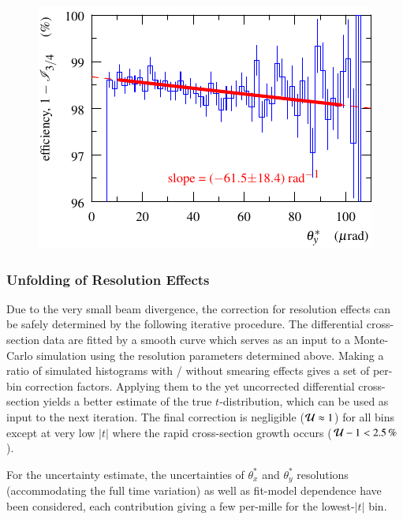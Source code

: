 \begin{figure}
\begin{center}
\includegraphics{fig/eff3outof4_fits.pdf}
\caption{%
}
\label{fig:eff 3/4}
\end{center}
\end{figure}



\subsubsection{Unfolding of Resolution Effects}
\label{sec:unfolding}


Due to the very small beam divergence, the correction for resolution effects can be safely determined by the following iterative procedure. The differential cross-section data are fitted by a smooth curve which serves as an input to a Monte-Carlo simulation using the resolution parameters determined above. Making a ratio of simulated histograms with / without smearing effects gives a set of per-bin correction factors. Applying them to the yet uncorrected differential cross-section yields a better estimate of the true $t$-distribution, which can be used as input to the next iteration. The final correction is negligible (${\cal U} \approx 1$) for all bins except at very low $|t|$ where the rapid cross-section growth occurs ($ {\cal U} - 1 < 2.5\un{\%}$).

For the uncertainty estimate, the uncertainties of $\theta_x^*$ and $\theta_y^*$ resolutions (accommodating the full time variation) as well as fit-model dependence have been considered, each contribution giving a few per-mille for the lowest-$|t|$ bin.


